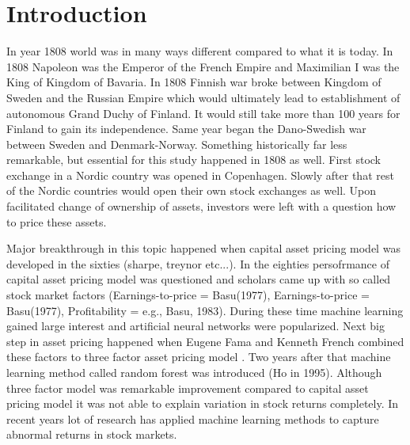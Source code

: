 \documentclass{article}
\begin{document}
\section{Introduction} \label{Introduction}
In year 1808 world was in many ways different compared to what it is today. In 1808 Napoleon was the Emperor of the French Empire and Maximilian I was the King of Kingdom of Bavaria. In 1808 Finnish war broke between Kingdom of Sweden and the Russian Empire which would ultimately lead to establishment of autonomous Grand Duchy of Finland. It would still take more than 100 years for Finland to gain its independence. Same year began the Dano-Swedish war between Sweden and Denmark-Norway. Something historically far less remarkable, but essential for this study happened in 1808 as well. First stock exchange in a Nordic country was opened in Copenhagen. Slowly after that rest of the Nordic countries would open their own stock exchanges as well. Upon facilitated change of ownership of assets, investors were left with a question how to price these assets. \par

Major breakthrough in this topic happened when capital asset pricing model was developed in the sixties (sharpe, treynor etc...). In the eighties persofrmance of capital asset pricing model was questioned and scholars came up with so called stock market factors (Earnings-to-price = Basu(1977), Earnings-to-price = Basu(1977), Profitability = e.g., Basu, 1983). During these time machine learning gained large interest and artificial neural networks were popularized. Next big step in asset pricing happened when Eugene Fama and Kenneth French combined these factors to three factor asset pricing model \cite{FAMA19933}. Two years after that machine learning method called random forest was introduced (Ho in 1995). Although three factor model was remarkable improvement compared to capital asset pricing model it was not able to explain variation in stock returns completely. In recent years lot of research has applied machine learning methods to capture abnormal returns in stock markets. \par
\end{document}
